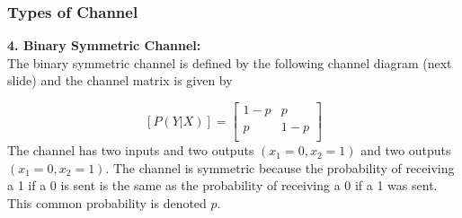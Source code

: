 \documentclass[a4]{beamer}
\begin{document}
\begin{frame}
\frametitle{Types of Channel}
\textbf{4. Binary Symmetric Channel:}\\
The binary symmetric channel is defined by the following channel diagram (next slide) and the channel matrix is given by

\[  [P(Y|X)]  = \left[ \begin{array}{cc}
1-p & p  \\
p & 1-p\\
\end{array} \right] \]
The channel has two inputs and two outputs $(x_1=0,x_2=1)$ and two outputs $(x_1=0,x_2=1)$. The channel is symmetric because the probability of receiving a 1 if a 0 is sent is the same as the probability of receiving a 0 if a 1 was sent. This common probability is denoted $p$.
\end{frame}
\end{document}
